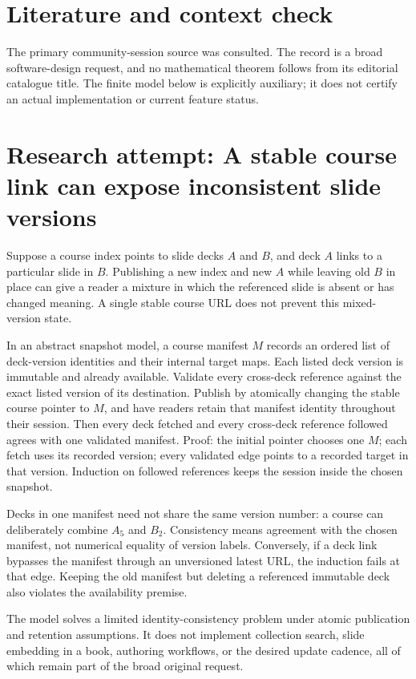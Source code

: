 \documentclass[11pt]{article}
\begin{document}
\section{Literature and context check}
The primary community-session source was consulted. The record is a broad software-design request, and no mathematical theorem follows from its editorial catalogue title. The finite model below is explicitly auxiliary; it does not certify an actual implementation or current feature status.
\section{Research attempt: A stable course link can expose inconsistent slide versions}
Suppose a course index points to slide decks $A$ and $B$, and deck $A$ links to a particular slide in $B$. Publishing a new index and new $A$ while leaving old $B$ in place can give a reader a mixture in which the referenced slide is absent or has changed meaning. A single stable course URL does not prevent this mixed-version state.

In an abstract snapshot model, a course manifest $M$ records an ordered list of deck-version identities and their internal target maps. Each listed deck version is immutable and already available. Validate every cross-deck reference against the exact listed version of its destination. Publish by atomically changing the stable course pointer to $M$, and have readers retain that manifest identity throughout their session. Then every deck fetched and every cross-deck reference followed agrees with one validated manifest. Proof: the initial pointer chooses one $M$; each fetch uses its recorded version; every validated edge points to a recorded target in that version. Induction on followed references keeps the session inside the chosen snapshot.

Decks in one manifest need not share the same version number: a course can deliberately combine $A_5$ and $B_2$. Consistency means agreement with the chosen manifest, not numerical equality of version labels. Conversely, if a deck link bypasses the manifest through an unversioned latest URL, the induction fails at that edge. Keeping the old manifest but deleting a referenced immutable deck also violates the availability premise.

The model solves a limited identity-consistency problem under atomic publication and retention assumptions. It does not implement collection search, slide embedding in a book, authoring workflows, or the desired update cadence, all of which remain part of the broad original request.
\end{document}
